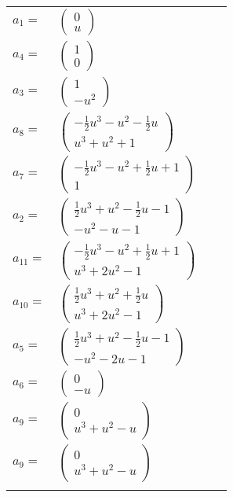\documentclass[1p]{elsarticle_modified}
\theoremstyle{definition}
\begin{document}
\begin{tabular}{m{7pt} m{180pt} m{7pt} m{180pt} }
\flushright $a_{1}=$&$\begin{pmatrix}0\\u\end{pmatrix}$ \\
\flushright $a_{4}=$&$\begin{pmatrix}1\\0\end{pmatrix}$ \\
\flushright $a_{3}=$&$\begin{pmatrix}1\\- u^2\end{pmatrix}$ \\
\flushright $a_{8}=$&$\begin{pmatrix}-\frac{1}{2} u^3- u^2-\frac{1}{2} u\\u^3+u^2+1\end{pmatrix}$ \\
\flushright $a_{7}=$&$\begin{pmatrix}-\frac{1}{2} u^3- u^2+\frac{1}{2} u+1\\1\end{pmatrix}$ \\
\flushright $a_{2}=$&$\begin{pmatrix}\frac{1}{2} u^3+u^2-\frac{1}{2} u-1\\- u^2- u-1\end{pmatrix}$ \\
\flushright $a_{11}=$&$\begin{pmatrix}-\frac{1}{2} u^3- u^2+\frac{1}{2} u+1\\u^3+2 u^2-1\end{pmatrix}$ \\
\flushright $a_{10}=$&$\begin{pmatrix}\frac{1}{2} u^3+u^2+\frac{1}{2} u\\u^3+2 u^2-1\end{pmatrix}$ \\
\flushright $a_{5}=$&$\begin{pmatrix}\frac{1}{2} u^3+u^2-\frac{1}{2} u-1\\- u^2-2 u-1\end{pmatrix}$ \\
\flushright $a_{6}=$&$\begin{pmatrix}0\\- u\end{pmatrix}$ \\
\flushright $a_{9}=$&$\begin{pmatrix}0\\u^3+u^2- u\end{pmatrix}$\\ \flushright $a_{9}=$&$\begin{pmatrix}0\\u^3+u^2- u\end{pmatrix}$\\&\end{tabular}
\end{document}
